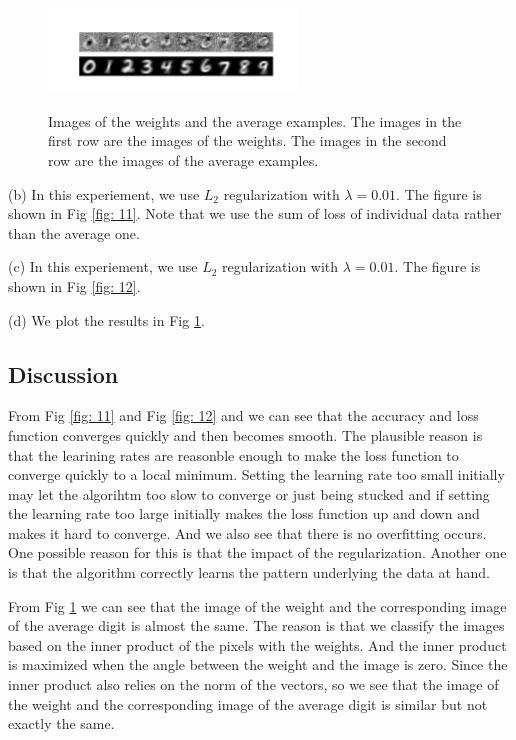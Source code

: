 \documentclass{article} %
\begin{document}
\begin{figure}[t]
	\centering	
	\includegraphics[width=2.6in,height=1.2in]{../softmax/figs/image_of_weights_and_digits.png} 
	\caption{Images of the weights and the average examples. The images in the first row are the images of the weights. The images in the second row are the images of the average examples.}
	\label{fig: 13}
\end{figure}

(b) In this experiement, we use $L_2$ regularization with $\lambda = 0.01$. The figure is shown in Fig \ref{fig: 11}. Note that we use the sum of loss of individual data rather than the average one.


(c) In this experiement, we use $L_2$ regularization with $\lambda = 0.01$. The figure is shown in Fig \ref{fig: 12}.

(d) We plot the results in Fig \ref{fig: 13}.


\subsection{Discussion}
From Fig \ref{fig: 11} and Fig \ref{fig: 12} and we can see that the accuracy and loss function converges quickly and then becomes smooth. The plausible reason is that the learining rates are reasonble enough to make the loss function to converge quickly to a local minimum. Setting the learning rate too small initially may let the algorihtm too slow to converge or just being stucked and if setting the learning rate too large initially makes the loss function up and down and makes it hard to converge. And we also see that there is no overfitting occurs. One possible reason for this is that the impact of the regularization. Another one is that the algorithm correctly learns the pattern underlying the data at hand.

From Fig \ref{fig: 13} we can see that the image of the weight and the corresponding image of the average digit is almost the same. The reason is that we classify the images based on the inner product of the pixels with the weights. And the inner product is maximized when the angle between the weight and the image is zero. Since the inner product also relies on the norm of the vectors, so we see that the image of the weight and the corresponding image of the average digit is similar but not exactly the same.
\end{document}

